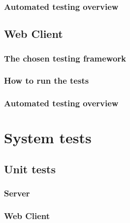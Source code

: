 \documentclass[a4paper,12pt]{article}
\begin{document}
	        \subsubsection{Automated testing overview}
	        
	    \subsection{Web Client}
	    
	    \subsubsection{The chosen testing framework}
	    
	    \subsubsection{How to run the tests}
	    
	    \subsubsection{Automated testing overview} 
        
    \section{System tests}
    
    	\subsection{Unit tests}
    	
    		\subsubsection{Server}
    		
    		\subsubsection{Web Client}
    	
\end{document}
